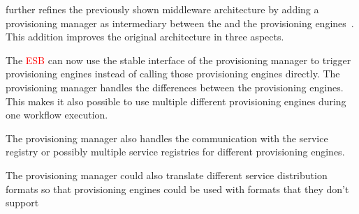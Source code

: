 \citeauthor{provisioning:dynamic} further refines the previously shown middleware architecture by adding a provisioning manager as intermediary between the  and the provisioning engines~\autocite{provisioning:dynamic}.
This addition improves the original architecture in three aspects.

The \textcolor{red}{ESB} can now use the stable interface of the provisioning manager to trigger provisioning engines instead of calling those provisioning engines directly.
The provisioning manager handles the differences between the provisioning engines.
This makes it also possible to use multiple different provisioning engines during one workflow execution.

The provisioning manager also handles the communication with the service registry or possibly multiple service registries for different provisioning engines.

The provisioning manager could also translate different service distribution formats so that provisioning engines could be used with formats that they don't support


